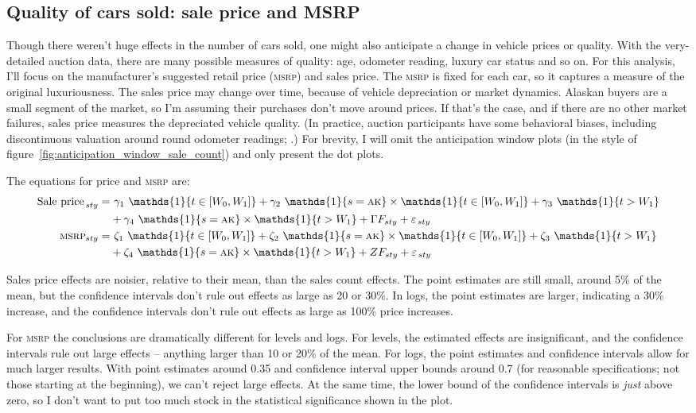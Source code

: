 \documentclass[11pt,letterpaper,oneside]{article}
\let\originalleft\left
\let\originalright\right
\renewcommand{\left}{\mathopen{}\mathclose\bgroup\originalleft}
\renewcommand{\right}{\aftergroup\egroup\originalright}
\newcommand{\msrp}{\textsc{msrp}}
\newcommand{\indicator}[1]{\mathds{1}\left\{#1\right\}}
\newcommand{\anticipation}{\indicator{t \in [W_0, W_1]}}
\newcommand{\isAlaska}{\indicator{s = \textsc{ak}}}
\newcommand{\postWindow}{\indicator{t > W_1}}
\newcommand{\ddEqn}[3]{%
\text{#1}_{\, sty} = & \  #2_1 \ \anticipation + #2_2 \ \isAlaska \times \anticipation + #2_3 \ \postWindow \\ \nonumber
&+ #2_4 \ \isAlaska \times \postWindow + #3 F_{ sty} + \varepsilon_{\, sty}
}
\newcommand{\ddEqnLog}[3]{%
\ln\left(\text{#1}_{\, sty}\right) = & \  #2_1 \ \anticipation + #2_2 \ \isAlaska \times \anticipation + #2_3 \ \postWindow \\ \nonumber
&+ #2_4 \ \isAlaska \times \postWindow + #3 F_{ sty} + \varepsilon_{\, sty}
}
\begin{document}
\begin{doublespacing}
\subsection{Quality of cars sold: sale price and MSRP}
Though there weren't huge effects in the number of cars sold, one might also anticipate a change in vehicle prices or quality.
With the very\hyp{}detailed auction data, there are many possible measures of quality: age, odometer reading, luxury car status and so on.
For this analysis, I'll focus on the manufacturer's suggested retail price (\msrp{}) and sales price.
The \msrp{} is fixed for each car, so it captures a measure of the original luxuriousness.
The sales price may change over time, because of vehicle depreciation or market dynamics.
Alaskan buyers are a small segment of the market, so I'm assuming their purchases don't move around prices.
If that's the case, and if there are no other market failures, sales price measures the depreciated vehicle quality.
(In practice, auction participants have some behavioral biases, including discontinuous valuation around round odometer readings; \cite{sallee2016consumers}.)
For brevity, I will omit the anticipation window plots (in the style of figure~\ref{fig:anticipation_window_sale_count}) and only present the dot plots.


The equations for price and \msrp{} are:
\begin{align}
    \label{eqn:sale-price}
    \ddEqn{Sale price}{\gamma}{\Gamma}\\
    \label{eqn:msrp}
    \ddEqn{\msrp{}\!}{\zeta}{Z} %
\end{align}


Sales price effects are noisier, relative to their mean, than the sales count effects.
The point estimates are still small, around 5\% of the mean, but the confidence intervals don't rule out effects as large as 20 or 30\%.
In logs, the point estimates are larger, indicating a 30\% increase, and the confidence intervals don't rule out effects as large as 100\% price increases.

For \msrp{} the conclusions are dramatically different for levels and logs.
    For levels, the estimated effects are insignificant, and the confidence intervals rule out large effects -- anything larger than 10 or 20\% of the mean.
    For logs, the point estimates and confidence intervals allow for much larger results.
    With point estimates around 0.35 and confidence interval upper bounds around 0.7 (for reasonable specifications; not those starting at the beginning), we can't reject large effects.
    At the same time, the lower bound of the confidence intervals is \emph{just} above zero, so I don't want to put too much stock in the statistical significance shown in the plot.



\end{doublespacing}
\end{document}
